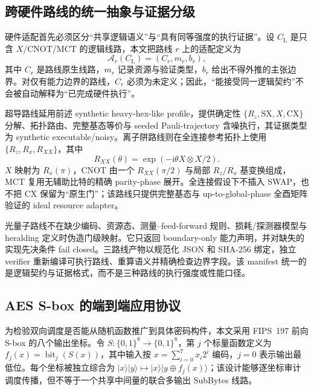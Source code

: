 \documentclass[UTF8,fontset=fandol,11pt]{ctexart}
\newcommand{\xor}{\ensuremath{\oplus}}
\newcommand{\rz}{\ensuremath{R_z}}
\begin{document}
\subsection{跨硬件路线的统一抽象与证据分级}

硬件适配首先必须区分“共享逻辑语义”与“具有同等强度的执行证据”。设 $C_{\mathrm L}$ 是只含 $X$/CNOT/MCT 的逻辑线路，本文把路线 $r$ 上的适配定义为
\begin{equation}
\mathcal A_r(C_{\mathrm L})=(C_r,m_r,b_r),
\label{eq:hardware-route-adapter}
\end{equation}
其中 $C_r$ 是路线原生线路，$m_r$ 记录资源与验证类型，$b_r$ 给出不得外推的主张边界。对仅有能力边界的路线，$C_r$ 必须为未定义；因此，“能接受同一逻辑契约”不会被自动解释为“已完成硬件执行”。

超导路线延用前述 synthetic heavy-hex-like profile，提供确定性 $\{\rz,\mathrm{SX},X,\mathrm{CX}\}$ 分解、拓扑路由、完整基态等价与 seeded Pauli-trajectory 含噪执行，其证据类型为 synthetic executable/noisy。离子阱路线则在全连接参考拓扑上使用 $\{R_z,R_x,R_{XX}\}$，其中
\begin{equation}
R_{XX}(\theta)=\exp\!\left(-\mathrm i\theta X\otimes X/2\right).
\label{eq:rxx-convention}
\end{equation}
$X$ 映射为 $R_x(\pi)$，CNOT 由一个 $R_{XX}(\pi/2)$ 与局部 $R_z/R_x$ 基变换组成，MCT 复用无辅助比特的精确 parity-phase 展开。全连接假设下不插入 SWAP，也不把 CX 保留为“原生门”；该路线只提供完整基态与 up-to-global-phase 全酉矩阵验证的 ideal resource adapter。

光量子路线不在缺少编码、资源态、测量--feed-forward 规则、损耗/探测器模型与 heralding 定义时伪造门级映射。它只返回 boundary-only 能力声明，并对缺失的实现先决条件 fail closed。三路线产物以规范化 JSON 和 SHA-256 绑定，独立 verifier 重新编译可执行路线、重算语义并精确检查边界字段。该 manifest 统一的是逻辑契约与证据格式，而不是三种路线的执行强度或性能口径。

\subsection{AES S-box 的端到端应用协议}

为检验双向调度是否能从随机函数推广到具体密码构件，本文采用 FIPS~197 前向 S-box 的八个输出坐标\cite{nist2023aes}。令 $S:\{0,1\}^8\rightarrow\{0,1\}^8$，第 $j$ 个标量函数定义为 $f_j(x)=\operatorname{bit}_j(S(x))$，其中输入按 $x=\sum_{i=0}^{7}x_i2^i$ 编码，$j=0$ 表示输出最低位。每个坐标被独立综合为 $|x\rangle|y\rangle\mapsto|x\rangle|y\xor f_j(x)\rangle$；该设计能够逐坐标审计调度传播，但不等于一个共享中间量的联合多输出 SubBytes 线路。
\end{document}
